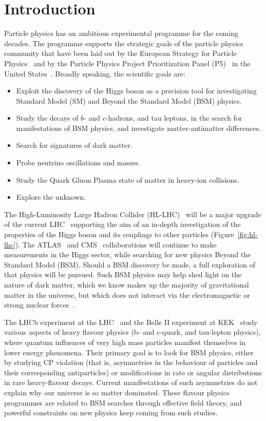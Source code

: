 \documentclass[twocolumn]{svjour3}          %
\begin{document}
\newpage

\hypertarget{introduction}{%
\section{Introduction}\label{introduction}}

Particle physics has an ambitious experimental programme for the
coming decades. The programme supports the strategic goals of the
particle physics community that have been laid out by the European
Strategy for Particle Physics~\cite{ESPP2013} and by
the Particle Physics Project Prioritization Panel (P5)~\cite{DOE-P5} in the United
States~\cite{2014pwa}. Broadly speaking, the
scientific goals are:

\begin{itemize}
\item Exploit the discovery of the Higgs boson as a precision tool
  for investigating Standard Model (SM) and Beyond the Standard Model
  (BSM) physics.
\item
  Study the decays of $b$- and $c$-hadrons, and tau leptons, in the search
  for manifestations of BSM physics, and investigate
  matter-antimatter differences.
\item
  Search for signatures of dark matter.
\item
  Probe neutrino oscillations and masses.
\item
  Study the Quark Gluon Plasma state of matter in heavy-ion collisions.
\item
  Explore the unknown.
\end{itemize}

The High-Luminosity Large Hadron Collider
(HL-LHC)~\cite{HL-LHC,1742-6596-515-1-012012,Apollinari:2284929} 
will be a major
upgrade of the current LHC~\cite{LHC} supporting the aim of 
an in-depth investigation of the properties of the Higgs boson and its
couplings to other particles (Figure~\ref{fig:hl-lhc}). The ATLAS~\cite{ATLAS} and CMS~\cite{CMS}
collaborations will continue to make measurements in the Higgs sector,
while searching for new physics Beyond the Standard Model (BSM). Should
a BSM discovery be made, a full exploration of that physics will be
pursued. Such BSM physics may help shed light on the nature of dark
matter, which we know makes up the majority of gravitational matter in
the universe, but which does not interact via the electromagnetic or
strong nuclear forces~\cite{Mangano2016}.

The LHCb experiment at the LHC~\cite{LHCb} and the Belle II experiment at
KEK~\cite{BelleII} study various aspects of heavy
flavour physics (b- and c-quark, and tau-lepton physics), where quantum
influences of very high mass particles manifest themselves in lower
energy phenomena. Their primary goal is to look for BSM physics, either
by studying CP violation (that is, asymmetries in the behaviour of
particles and their corresponding antiparticles) or modifications in
rate or angular distributions in rare heavy-flavour decays. Current
manifestations of such asymmetries do not explain why our universe is so
matter dominated. These flavour physics programmes are related to BSM
searches through effective field theory, and powerful constraints on new
physics keep coming from such studies.
\end{document}
